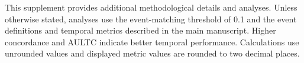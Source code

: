 \label{ch08:supp:material}


This supplement provides additional methodological details and analyses.
Unless otherwise stated, analyses use the event-matching threshold of 0.1 and the event definitions and temporal metrics described in the main manuscript.
Higher concordance and AULTC indicate better temporal performance.
Calculations use unrounded values and displayed metric values are rounded to two decimal places.

